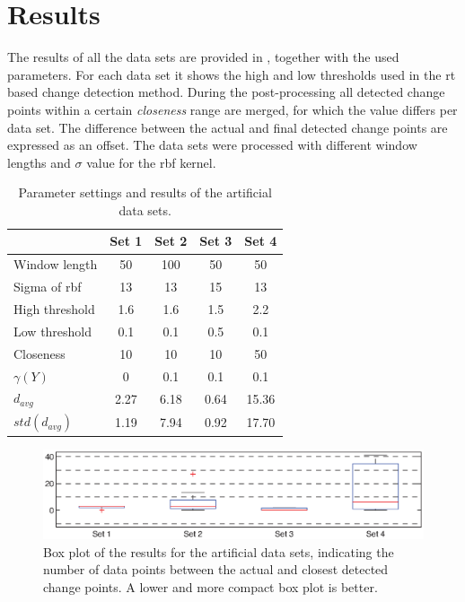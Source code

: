 \section{Results}\label{sec:artificial_data_results}
The results of all the data sets are provided in , together with the used parameters.
For each data set it shows the high and low thresholds used in the \gls{rt} based change detection method.
During the post-processing all detected change points within a certain \emph{closeness} range are merged, for which the value differs per data set.
The difference between the actual and final detected change points are expressed as an offset.
The data sets were processed with different window lengths and $\sigma$ value for the \gls{rbf} kernel.

\begin{table}
  \centering
  \caption[Results artificial data sets]{Parameter settings and results of the artificial data sets.}
  \begin{tabulary}{\textwidth}{|l|c|c|c|c|}
     & Set 1 & Set 2 & Set 3 & Set 4 \\
    \hline
    Window length & 50 & 100 & 50 & 50 \\
    \hline
    Sigma of \gls{rbf} & 13 & 13 & 15 & 13 \\
    \hline
    High threshold & 1.6 & 1.6 & 1.5 & 2.2 \\
    \hline
    Low threshold & 0.1 & 0.1 & 0.5 & 0.1 \\
    \hline
    Closeness & 10 & 10 & 10 & 50 \\
    \hline
    \hline
    $\gamma(Y)$ & 0 & 0.1 & 0.1 & 0.1 \\
    \hline
    $d_{avg}$ & 2.27 & 6.18 & 0.64 & 15.36 \\
    \hline
    $std(d_{avg})$ & 1.19 & 7.94 & 0.92 & 17.70 \\
    \hline
  \end{tabulary}
  \label{tab:results_artificial}
\end{table}

\begin{figure}
\centering
  \includegraphics[width=1\textwidth]{./Figures/chapter5/boxplot_results_artificial_sets.eps}
  \caption[Box plot results artificial data sets]{Box plot of the results for the artificial data sets, indicating the number of data points between the actual and closest detected change points. A lower and more compact box plot is better.}
  \label{fig:boxplot_artificial_sets}
\end{figure}

